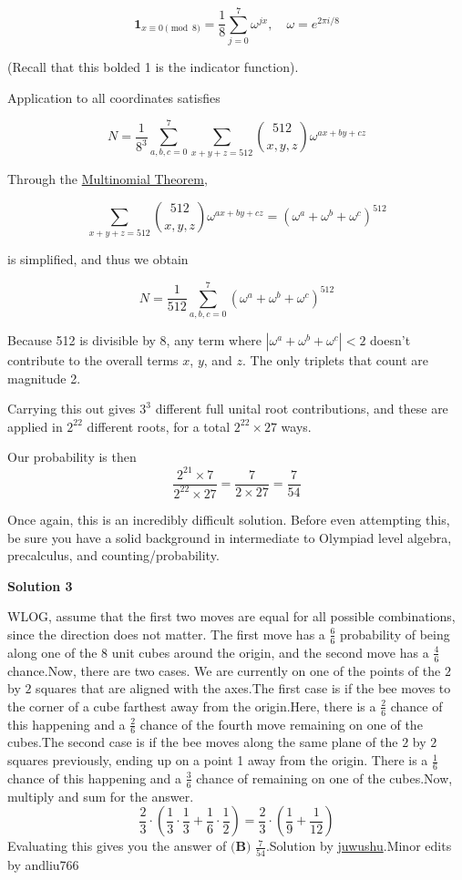 \begin{enumerate}
 
 \[\mathbf{1}_{x \equiv 0 \pmod{8}} = \frac{1}{8} \sum_{j=0}^7 \omega^{jx}, \quad \omega = e^{2\pi i / 8}\]

 (Recall that this bolded 1 is the indicator function).

 Application to all coordinates satisfies 

 
 \[N = \frac{1}{8^3} \sum_{a,b,c=0}^{7} \sum_{x+y+z=512} \binom{512}{x, y, z} \omega^{ax+by+cz}\]

 Through the \href{https://artofproblemsolving.com/wiki/index.php?title=Multinomial\_Theorem}{Multinomial Theorem}, 

 
 \[\sum_{x+y+z=512} \binom{512}{x, y, z} \omega^{ax+by+cz} = (\omega^a + \omega^b + \omega^c)^{512}\]

 is simplified, and thus we obtain 

 
 \[N = \frac{1}{512} \sum_{a,b,c=0}^{7} (\omega^a + \omega^b + \omega^c)^{512}\]

 Because 512 is divisible by 8, any term where \( |\omega^a + \omega^b + \omega^c| < 2 \) doesn't contribute to the overall terms \( x \), \( y \), and \( z \). The only triplets that count are magnitude 2.

 Carrying this out gives \( 3^3 \) different full unital root contributions, and these are applied in \( 2^{22} \) different roots, for a total \( 2^{22} \times 27 \) ways. 

 Our probability is then
 \[\frac{2^{21} \times 7}{2^{22} \times 27} = \frac{7}{2 \times 27} = \boxed{\frac{7}{54}}\]

 Once again, this is an incredibly difficult solution. Before even attempting this, be sure you have a solid background in intermediate to Olympiad level algebra, precalculus, and counting/probability.

 



\textbf{Solution 3}

WLOG, assume that the first two moves are equal for all possible combinations, since the direction does not matter. The first move has a $\frac{6}{6}$ probability of being along one of the $8$ unit cubes around the origin, and the second move has a $\frac{4}{6}$ chance.Now, there are two cases. We are currently on one of the points of the $2$ by $2$ squares that are aligned with the axes.The first case is if the bee moves to the corner of a cube farthest away from the origin.Here, there is a $\frac{2}{6}$ chance of this happening and a $\frac{2}{6}$ chance of the fourth move remaining on one of the cubes.The second case is if the bee moves along the same plane of the $2$ by $2$ squares previously, ending up on a point 1 away from the origin. There is a $\frac{1}{6}$ chance of this happening and a $\frac{3}{6}$ chance of remaining on one of the cubes.Now, multiply and sum for the answer.
 \[\frac{2}{3}\cdot(\frac{1}{3}\cdot\frac{1}{3}+\frac{1}{6}\cdot\frac{1}{2})=\frac{2}{3}\cdot(\frac{1}{9}+\frac{1}{12})\]Evaluating this gives you the answer of $\boxed{\textbf{(B) }\frac{7}{54}}$.Solution by \href{https://artofproblemsolving.com/wiki/index.php?title=User:Juwushu}{juwushu}.Minor edits by andliu766


\end{enumerate}
